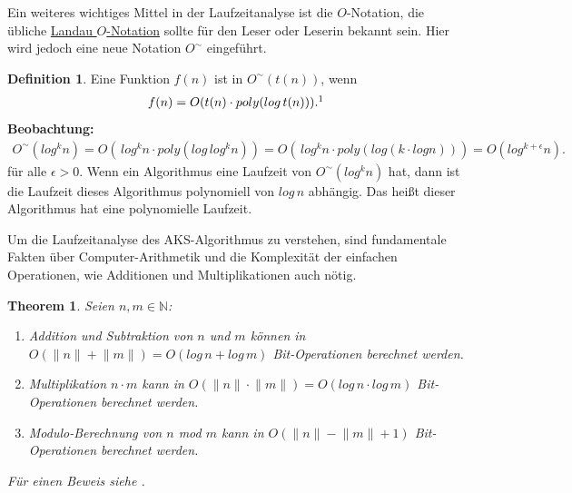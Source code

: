 \documentclass[12pt,oneside]{article}
\newtheorem{theorem}{Theorem}[section]
\theoremstyle{remark}
\theoremstyle{definition}
\newtheorem{definition}{Definition}[section]
\begin{document}
Ein weiteres wichtiges Mittel in der Laufzeitanalyse ist die $O$-Notation, die übliche \href{https://en.wikipedia.org/wiki/Big_O_notation}{Landau $O$-Notation} sollte für den Leser oder Leserin bekannt sein. Hier wird jedoch eine neue Notation $O^{\sim}$ eingeführt. 
\begin{definition}
Eine Funktion $f(n)$ ist in $ O^{\sim}(t(n))$, wenn
\begin{align*}
    f(n) = O(t(n) \cdot poly(log \, t(n))).\footnotemark
\end{align*}
\textbf{\small{Beobachtung:}}
\begin{align*}
    O^{\sim}(log^k n) = O( \, log^k n \cdot poly(log \, log^k n)) = O(\, log^k n \cdot poly(log( k \cdot log n))) = O(log^{k+\epsilon}n).
\end{align*}
für alle $\epsilon > 0$. Wenn ein Algorithmus eine Laufzeit von $O^{\sim}(log^k n)$ hat, dann ist die Laufzeit dieses Algorithmus polynomiell von $log \, n$ abhängig. Das heißt dieser Algorithmus hat eine polynomielle Laufzeit.
\end{definition}

\smallskip


Um die Laufzeitanalyse des AKS-Algorithmus zu verstehen, sind fundamentale Fakten über Computer-Arithmetik und die Komplexität der einfachen Operationen, wie Additionen und Multiplikationen auch nötig.

\begin{theorem}\label{fact_1}
Seien $n,m \in \mathbb{N}$:\newline
\begin{enumerate}
\itemsep0.6em 
    \item Addition und Subtraktion von $n$ und $m$ können in $O(\lVert n \rVert + \lVert m \rVert) = O(log \, n + log \, m)$ Bit-Operationen berechnet werden.\newline
    \item Multiplikation $ n \cdot m$ kann in $O(\lVert n \rVert \cdot \lVert m \rVert) = O(log \, n \cdot log \, m)$ Bit-Operationen berechnet werden.\newline
    \item Modulo-Berechnung von $n$ mod $m$ kann in $O(\lVert n \rVert - \lVert m \rVert + 1)$ Bit-Operationen berechnet werden.\newline\newline
\end{enumerate}
Für einen Beweis siehe \cite{D73}.
\end{theorem}
\end{document}
